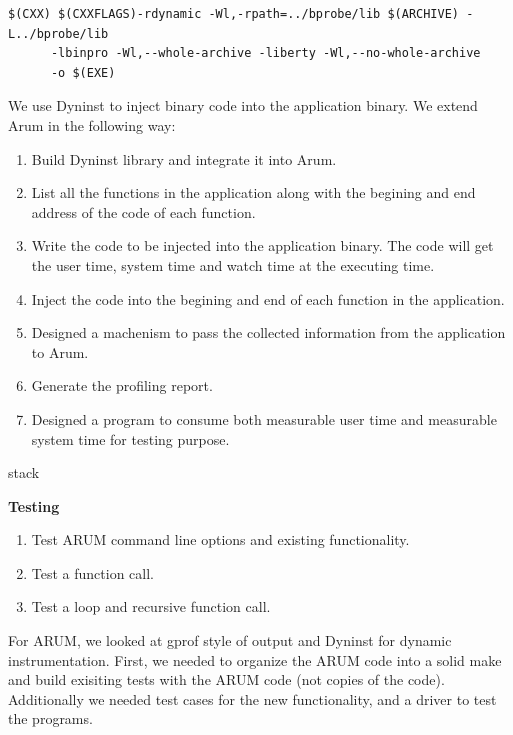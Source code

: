 \documentclass[11pt,letterpaper,oneside]{article}
\begin{document}
\begin{Verbatim}[frame=single]
$(CXX) $(CXXFLAGS)-rdynamic -Wl,-rpath=../bprobe/lib $(ARCHIVE) -L../bprobe/lib
      -lbinpro -Wl,--whole-archive -liberty -Wl,--no-whole-archive
      -o $(EXE)
\end{Verbatim}


We use Dyninst to inject binary code into the application binary. We extend Arum in the following way:
\begin{enumerate}
\item Build Dyninst library and integrate it into Arum.
\item List all the functions in the application along with the begining and end address of the code of each function.
\item Write the code to be injected into the application binary. The code will get the user time, system time and watch time at the executing time.
\item Inject the code into the begining and end of each function in the application.
\item Designed a machenism to pass the collected information from the application to Arum.
\item Generate the profiling report.
\item Designed a program to consume both measurable user time and measurable system time for testing purpose.
\end{enumerate}

stack

\textbf{Testing}
\begin{enumerate}
\item Test ARUM command line options and existing functionality.
\item Test a function call.
\item Test a loop and recursive function call.
\end{enumerate}

For ARUM, we looked at gprof style of output and Dyninst for dynamic instrumentation.  First, we needed to organize the ARUM code into a solid make and build exisiting tests with the ARUM code (not copies of the code).   Additionally we needed test cases for the new functionality, and a driver to test the programs.
\end{document}
